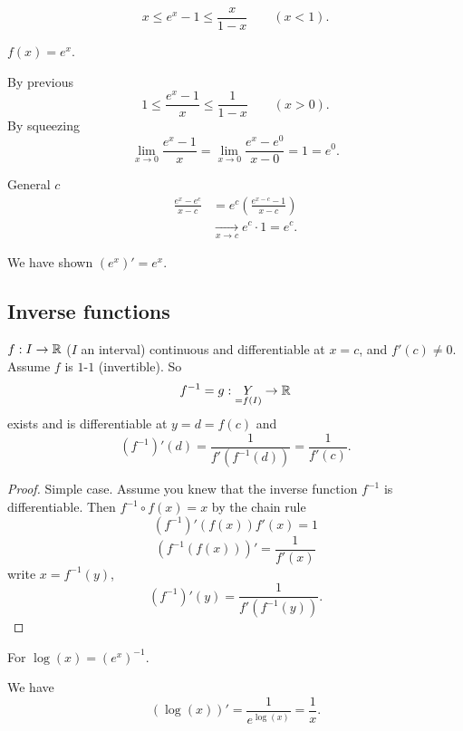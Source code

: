 \documentclass[10pt, a4paper]{article}
\begin{document}
\begin{lemma}
    \[
    x \leq e ^ x - 1 \leq \frac{x}{1 - x}\qquad(x < 1).
    \]
\end{lemma}

\begin{example}
    $f(x) = e ^ x$.
    
    \begin{solution}
        By previous
        \[
        1 \leq \frac{e ^ x - 1}{x} \leq \frac{1}{1 - x}\qquad(x > 0).
        \]
        By squeezing
        \[
        \lim_{x \rightarrow 0}\frac{e ^ x - 1}{x} = \lim_{x \rightarrow 0}\frac{e ^ x - e ^ 0}{x - 0} = 1 = e ^ 0.
        \]

        General $c$
        \begin{align*}
            \frac{e ^ x - e ^ c}{x - c} &= e ^ c\left(\frac{e ^ {x - c} - 1}{x - c}\right) \\
            &\xrightarrow[x \rightarrow c]{}e ^ c \cdot 1 = e ^ c.
        \end{align*}

        We have shown $(e ^ x)' = e ^ x$.
    \end{solution}
\end{example}

\subsection{Inverse functions}
\begin{theorem}
    $f : I \rightarrow \mathbb{R}$
    ($I$ an interval)
    continuous and differentiable at $x = c$,
    and $f'(c) \neq 0$.
    Assume $f$ is $1$-$1$
    (invertible).
    So
    \[
    f ^ {-1} = g : \underset{= f(I)}{Y} \rightarrow \mathbb{R}
    \]
    exists and is differentiable at $y = d = f(c)$ and
    \[
    (f ^ {-1})'(d) = \frac{1}{f'(f ^ {-1}(d))} = \frac{1}{f'(c)}.
    \]

    \begin{proof}
        Simple case.
        Assume you knew that the inverse function $f ^ {-1}$ is differentiable.
        Then $f ^ {-1} \circ f(x) = x$ by the chain rule
        \[
        (f ^ {-1})'(f(x))f'(x) = 1
        \]
        \[
        (f ^ {-1}(f(x)))' = \frac{1}{f'(x)}
        \]
        write $x = f ^ {-1}(y)$,
        \[
        (f ^ {-1})'(y) = \frac{1}{f'(f ^ {-1}(y))}.
        \]
    \end{proof}
\end{theorem}

\begin{example}
    For $\log(x) = (e ^ x) ^ {-1}$.

    \begin{solution}
        We have
        \[
        (\log(x))' = \frac{1}{e ^ {\log(x)}} = \frac{1}{x}.
        \]
    \end{solution}
\end{example}
\end{document}
